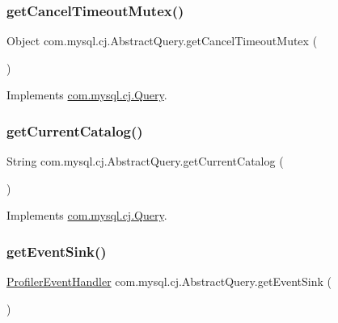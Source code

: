 \subsubsection{\texorpdfstring{get\+Cancel\+Timeout\+Mutex()}{getCancelTimeoutMutex()}}
{\footnotesize\ttfamily Object com.\+mysql.\+cj.\+Abstract\+Query.\+get\+Cancel\+Timeout\+Mutex (\begin{DoxyParamCaption}{ }\end{DoxyParamCaption})}



Implements \mbox{\hyperlink{interfacecom_1_1mysql_1_1cj_1_1_query_af99b8945b78c6f6cec21d9a81e227d1e}{com.\+mysql.\+cj.\+Query}}.

\mbox{\label{classcom_1_1mysql_1_1cj_1_1_abstract_query_a77d27488fdee8947c779e97796b433c3}} 
\subsubsection{\texorpdfstring{get\+Current\+Catalog()}{getCurrentCatalog()}}
{\footnotesize\ttfamily String com.\+mysql.\+cj.\+Abstract\+Query.\+get\+Current\+Catalog (\begin{DoxyParamCaption}{ }\end{DoxyParamCaption})}



Implements \mbox{\hyperlink{interfacecom_1_1mysql_1_1cj_1_1_query_a5e5e4f493fd7d0ea5e0ac6d2066af251}{com.\+mysql.\+cj.\+Query}}.

\mbox{\label{classcom_1_1mysql_1_1cj_1_1_abstract_query_aff7c49f712e8aa2e756fc9668f428970}} 
\subsubsection{\texorpdfstring{get\+Event\+Sink()}{getEventSink()}}
{\footnotesize\ttfamily \mbox{\hyperlink{interfacecom_1_1mysql_1_1cj_1_1log_1_1_profiler_event_handler}{Profiler\+Event\+Handler}} com.\+mysql.\+cj.\+Abstract\+Query.\+get\+Event\+Sink (\begin{DoxyParamCaption}{ }\end{DoxyParamCaption})}



